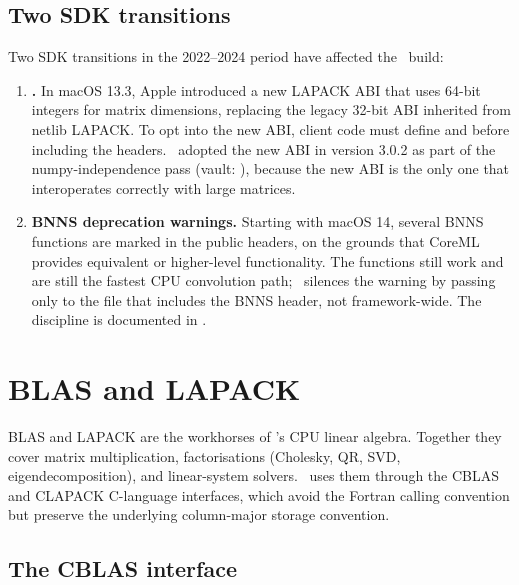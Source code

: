 \subsection{Two SDK transitions}
\label{ssec:accelerate:sdk_transitions}

Two SDK transitions in the 2022--2024 period have affected the
\Lucid\ build:

\begin{enumerate}
  \item \textbf{.} In macOS 13.3,
    Apple introduced a new LAPACK ABI that uses 64-bit integers for
    matrix dimensions, replacing the legacy 32-bit ABI inherited
    from netlib LAPACK. To opt into the new ABI, client code must
    define  and
     before including the headers.
    \Lucid\ adopted the new ABI in version 3.0.2 as part of the
    numpy-independence pass (vault:
    ), because the new ABI
    is the only one that interoperates correctly with large
    matrices.
  \item \textbf{BNNS deprecation warnings.} Starting with macOS 14,
    several BNNS functions are marked  in the
    public headers, on the grounds that CoreML provides equivalent
    or higher-level functionality. The functions still work and are
    still the fastest CPU convolution path; \Lucid\ silences the
    warning by passing  only to
    the file that includes the BNNS header, not framework-wide. The
    discipline is documented in .
\end{enumerate}

\section{BLAS and LAPACK}
\label{sec:accelerate:blas}

BLAS and LAPACK are the workhorses of \Lucid's CPU linear algebra.
Together they cover matrix multiplication, factorisations
(Cholesky, QR, SVD, eigendecomposition), and linear-system solvers.
\Lucid\ uses them through the CBLAS and CLAPACK C-language
interfaces, which avoid the Fortran calling convention but preserve
the underlying column-major storage convention.

\subsection{The CBLAS interface}
\label{ssec:accelerate:cblas}

